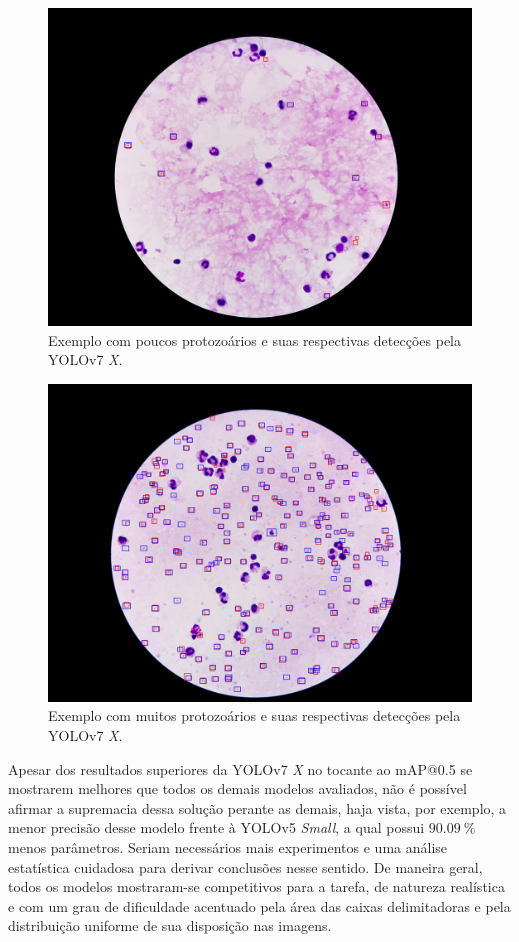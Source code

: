  \begin{figure}[h!]
  	\centering
   \includegraphics[width=\linewidth]{./img/full-predictions/result1-v7.jpg}
   \caption{Exemplo com poucos protozoários e suas respectivas detecções pela YOLOv7 \emph{X}.} \label{ex:poucos}
 \end{figure}

 \begin{figure}[h!]
  	\centering
   \includegraphics[width=\linewidth]{./img/full-predictions/result5-v7.jpg}
   \caption{Exemplo com muitos protozoários e suas respectivas detecções pela YOLOv7 \emph{X}.} \label{ex:muitos}
 \end{figure}

Apesar dos resultados superiores da YOLOv7 \emph{X} no tocante ao mAP@0.5 se mostrarem melhores que todos os demais modelos avaliados, não é possível afirmar a supremacia dessa solução perante as demais, haja vista, por exemplo, a menor precisão desse modelo frente à YOLOv5 \emph{Small}, a qual possui $\SI{90.09}{\percent}$ menos parâmetros. Seriam necessários mais experimentos e uma análise estatística cuidadosa para derivar conclusões nesse sentido. De maneira geral, todos os modelos mostraram-se competitivos para a tarefa, de natureza realística e com um grau de dificuldade acentuado pela área das caixas delimitadoras e pela distribuição uniforme de sua disposição nas imagens.



